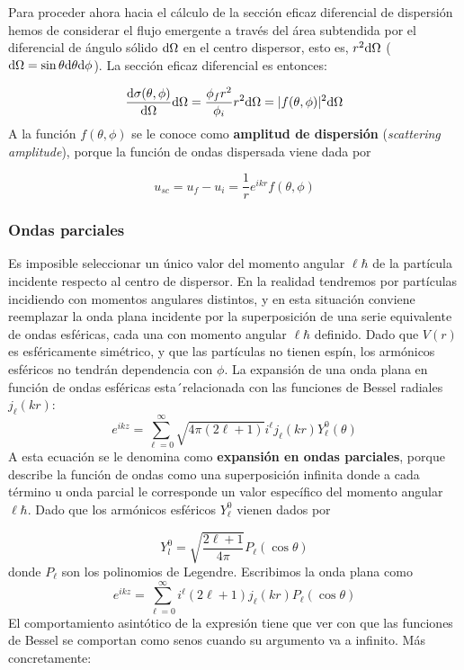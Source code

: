 Para proceder ahora hacia el cálculo de la sección eficaz diferencial de dispersión hemos de considerar el flujo emergente a través del área subtendida por el diferencial de ángulo sólido $\mathrm{d} \Omega$ en el centro dispersor, esto es, $r^2 \mathrm{d} \Omega$ ($\mathrm{d} \Omega = \sin \theta \mathrm{d} \theta \mathrm{d} \phi$). La sección eficaz diferencial es entonces:

\begin{equation}
	\frac{\mathrm{d} \sigma (\theta,\phi)}{\mathrm{d} \Omega} \mathrm{d} \Omega = \frac{\phi_f r^2}{\phi_i} r^2 \mathrm{d} \Omega = |f(\theta,\phi)|^2 \mathrm{d} \Omega
\end{equation}
A la función $f(\theta,\phi)$ se le conoce como \textbf{amplitud de dispersión} (\textit{scattering amplitude}), porque la función de ondas dispersada viene dada por 

\begin{equation}
	 u_{sc} = u_f - u_i = \frac{1}{r} e^{ikr} f(\theta,\phi)
\end{equation}

\subsubsection{Ondas parciales}

Es imposible seleccionar un único valor del momento angular $\ell\hbar$ de la partícula incidente respecto al centro de dispersor. En la realidad tendremos por partículas incidiendo con momentos angulares distintos, y en esta situación conviene reemplazar la onda plana incidente por la superposición de una serie equivalente de ondas esféricas, cada una con momento angular $\ell \hbar$ definido. Dado que $V(r)$ es esféricamente simétrico, y que las partículas no tienen espín, los armónicos esféricos no tendrán dependencia con $\phi$. La expansión de una onda plana en función de ondas esféricas esta´relacionada con las funciones de Bessel radiales $j_{\ell}(kr)$:
\begin{equation}
	e^{ikz} = \sum_{\ell=0}^{\infty} \sqrt{4\pi (2\ell +1)} i^{\ell} j_\ell (kr) Y_{\ell}^0 (\theta)
\end{equation}
A esta ecuación se le denomina como \textbf{expansión en ondas parciales}, porque describe la función de ondas como una superposición infinita donde a cada término u onda parcial le corresponde un valor específico del momento angular $\ell \hbar$. Dado que los armónicos esféricos $Y_{\ell}^0$ vienen dados por 

\begin{equation}
	Y_l^0 = \sqrt{\frac{2\ell+1}{4\pi}} P_{\ell} (\cos\theta)
\end{equation}
donde $P_\ell$ son los polinomios de Legendre. Escribimos la onda plana como
\begin{equation}
	e^{ikz} = \sum_{\ell=0}^{\infty} i^{\ell} (2\ell +1) j_\ell (kr) P_\ell (\cos \theta)
\end{equation}
El comportamiento asintótico de la expresión tiene que ver con que las funciones de Bessel se comportan como senos cuando su argumento va a infinito. Más concretamente:


